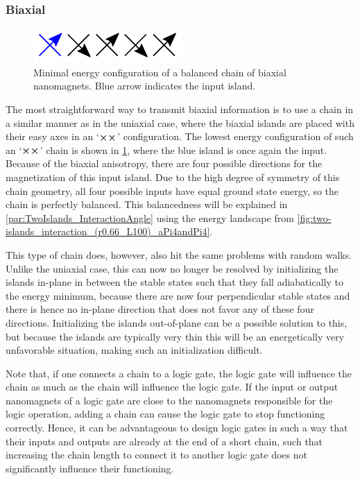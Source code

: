\documentclass[11pt,a4paper,english]{article}
\begin{document}
\subsubsection{Biaxial}
\begin{figure}
    \centering
    \includegraphics[width=0.5\columnwidth]{Figures/Introduction/Biaxial_chain.pdf}
    \caption{Minimal energy configuration of a balanced chain of biaxial nanomagnets. Blue arrow indicates the input island.}
    \label{fig:Intro_IslandBiaxialChainGeometry}
\end{figure}
The most straightforward way to transmit biaxial information is to use a chain in a similar manner as in the uniaxial case, where the biaxial islands are placed with their easy axes in an `$\cross \cross$' configuration. The lowest energy configuration of such an `$\cross \cross$' chain is shown in \cref{fig:Intro_IslandBiaxialChainGeometry}, where the blue island is once again the input. Because of the biaxial anisotropy, there are four possible directions for the magnetization of this input island. Due to the high degree of symmetry of this chain geometry, all four possible inputs have equal ground state energy, so the chain is perfectly balanced. This balancedness will be explained in \cref{par:TwoIslands_InteractionAngle} using the energy landscape from \cref{fig:two-islands_interaction_(r0.66_L100)_aPi4andPi4}. \par
This type of chain does, however, also hit the same problems with random walks. Unlike the uniaxial case, this can now no longer be resolved by initializing the islands in-plane in between the stable states such that they fall adiabatically to the energy minimum, because there are now four perpendicular stable states and there is hence no in-plane direction that does not favor any of these four directions. Initializing the islands out-of-plane can be a possible solution to this, but because the islands are typically very thin this will be an energetically very unfavorable situation, making such an initialization difficult. \par
Note that, if one connects a chain to a logic gate, the logic gate will influence the chain as much as the chain will influence the logic gate. If the input or output nanomagnets of a logic gate are close to the nanomagnets responsible for the logic operation, adding a chain can cause the logic gate to stop functioning correctly. Hence, it can be advantageous to design logic gates in such a way that their inputs and outputs are already at the end of a short chain, such that increasing the chain length to connect it to another logic gate does not significantly influence their functioning.
\end{document}
